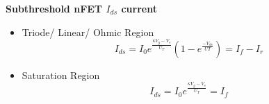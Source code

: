 \textbf{Subthreshold nFET $I_{ds}$ current}
\begin{itemize}
    \item Triode/ Linear/ Ohmic Region
    \begin{equation}
        I_{ds} = I_0 e^{\frac{\kappa V_g - V_s}{U_T}} (1 - e^{\frac{-V_{ds}}{UT}}) = I_f - I_r
    \end{equation}
    \item Saturation Region
    \begin{equation}
        I_{ds} = I_0 e^{\frac{\kappa V_g - V_s}{U_T}} = I_f
    \end{equation}
\end{itemize}


